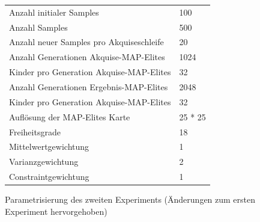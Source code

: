 \begin{figure}[h]
	\centering
	\begin{tabularx}{.75\textwidth}{ll}\hline
		Anzahl initialer Samples & 100 \\
		Anzahl Samples & 500 \\
		Anzahl neuer Samples pro Akquiseschleife & 20 \\
		Anzahl Generationen Akquise-MAP-Elites & 1024 \\
		Kinder pro Generation Akquise-MAP-Elites & 32 \\
		Anzahl Generationen Ergebnis-MAP-Elites & 2048 \\
		Kinder pro Generation Akquise-MAP-Elites & 32 \\
		Auflösung der MAP-Elites Karte & 25 * 25  \\
		\hline
		Freiheitsgrade & 18 \\
		Mittelwertgewichtung & 1 \\
		Varianzgewichtung & 2 \\
		Constraintgewichtung & 1 \\
	\end{tabularx}
	\label{tab:param2nd}
	\caption{Parametrisierung des zweiten Experiments (Änderungen zum ersten Experiment hervorgehoben)}
\end{figure}

